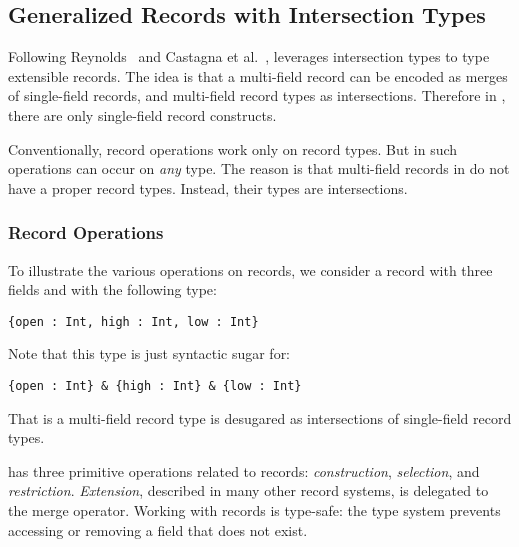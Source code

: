 

\subsection{Generalized Records with Intersection Types}

Following Reynolds~\cite{reynolds1997design} and Castagna et
al.~\cite{castagna1995calculus}, \name leverages intersection types to type
extensible records. The idea is that a multi-field record can be encoded as
merges of single-field records, and multi-field record types as intersections.
Therefore in \name, there are only single-field record constructs.

Conventionally, record operations work only on record types. But in \name
such operations can occur on \emph{any} type. The
reason is that multi-field records in \name do not have a proper
record types. Instead, their types are intersections.

\subsubsection{Record Operations}

To illustrate the various operations on records, we consider a record
with three fields and with the following type:

\begin{lstlisting}
{open : Int, high : Int, low : Int}
\end{lstlisting}

\noindent Note that this type is just syntactic sugar for:

\begin{lstlisting}
{open : Int} & {high : Int} & {low : Int}
\end{lstlisting}

\noindent That is a multi-field record type is desugared as
intersections of single-field record types.

\name has three primitive operations related to records: \emph{construction},
\emph{selection}, and \emph{restriction}. \emph{Extension}, described in many
other record systems, is delegated to the merge operator. Working with records
is type-safe: the type system prevents accessing or removing a field that does
not exist.

